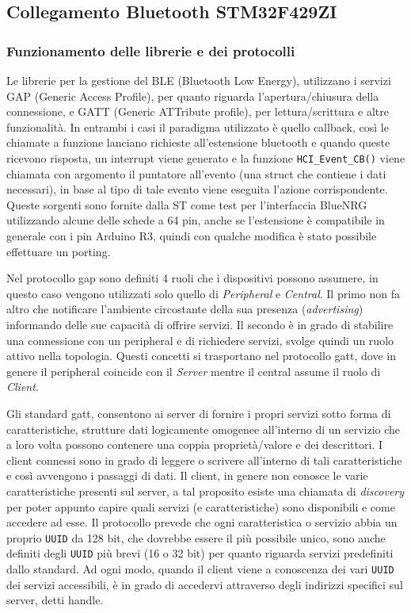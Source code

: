 \subsection{Collegamento Bluetooth STM32F429ZI}

\subsubsection{Funzionamento delle librerie e dei protocolli}

Le librerie per la gestione del BLE (Bluetooth Low Energy), utilizzano i servizi GAP (Generic Access Profile), per quanto riguarda l'apertura/chiusura della connessione, e GATT (Generic ATTribute profile), per lettura/scrittura e altre funzionalit\`a. In entrambi i casi il paradigma utilizzato \`e quello callback, cos\`i le chiamate a funzione lanciano richieste all'estensione bluetooth e quando queste ricevono risposta, un interrupt viene generato e la funzione \texttt{HCI\_Event\_CB()} viene chiamata con argomento il puntatore all'evento (una struct che contiene i dati necessari), in base al tipo di tale evento viene eseguita l'azione corrispondente.
Queste sorgenti sono fornite dalla ST come test per l'interfaccia BlueNRG utilizzando alcune delle schede a 64 pin, anche se l'estensione \`e compatibile in generale con i pin Arduino R3, quindi con qualche modifica \`e stato possibile effettuare un porting.

Nel protocollo gap sono definiti 4 ruoli che i dispositivi possono assumere, in questo caso vengono utilizzati solo quello di \textit{Peripheral} e \textit{Central}. Il primo non fa altro che notificare l'ambiente circostante della sua presenza (\textit{advertising}) informando delle sue capacit\`a di offrire servizi. Il secondo \`e in grado di stabilire una connessione con un peripheral e di richiedere servizi, svolge quindi un ruolo attivo nella topologia. Questi concetti si trasportano nel protocollo gatt, dove in genere il peripheral coincide con il \textit{Server} mentre il central assume il ruolo di \textit{Client}.

Gli standard gatt, consentono ai server di fornire i propri servizi sotto forma di caratteristiche, strutture dati logicamente omogenee all'interno di un servizio che a loro volta possono contenere una coppia propriet\`a/valore e dei descrittori. I client connessi sono in grado di leggere o scrivere all'interno di tali caratteristiche e cos\`i avvengono i passaggi di dati. Il client, in genere non conosce le varie caratteristiche presenti sul server, a tal proposito esiste una chiamata di \textit{discovery} per poter appunto capire quali servizi (e caratteristiche) sono disponibili e come accedere ad esse. Il protocollo prevede che ogni caratteristica o servizio abbia un proprio \texttt{UUID} da 128 bit, che dovrebbe essere il pi\`u possibile unico, sono anche definiti degli \texttt{UUID} pi\`u brevi (16 o 32 bit) per quanto riguarda servizi predefiniti dallo standard. Ad ogni modo, quando il client viene a conoscenza dei vari \texttt{UUID} dei servizi accessibili, \`e in grado di accedervi attraverso degli indirizzi specifici sul server, detti handle.


